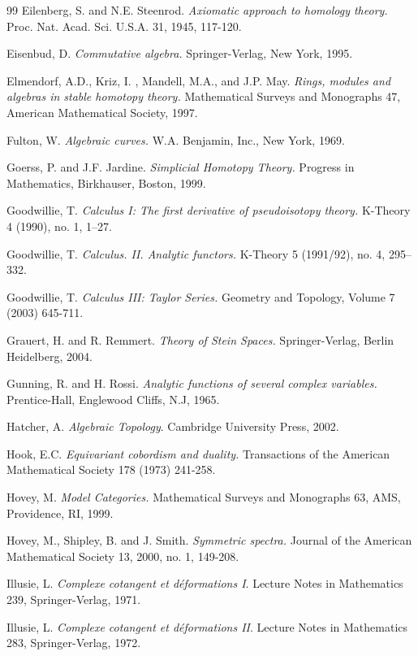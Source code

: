 \documentclass{article}
\theoremstyle{definition}
\begin{document}
\begin{thebibliography}{99}
 Eilenberg, S. and N.E. Steenrod. {\it Axiomatic approach to homology theory.} Proc. Nat. Acad. Sci. U.S.A. 31, 1945, 117-120.

 Eisenbud, D. {\it Commutative algebra.} Springer-Verlag, New York, 1995. 

 Elmendorf, A.D., Kriz, I. , Mandell, M.A., and J.P.
May. {\it Rings, modules and algebras in stable homotopy theory.}
Mathematical Surveys and Monographs 47, American Mathematical
Society, 1997.

 Fulton, W. {\it Algebraic curves.} W.A.
Benjamin, Inc., New York, 1969.

 Goerss, P. and J.F. Jardine. {\it Simplicial Homotopy Theory.} Progress in Mathematics, Birkhauser, Boston, 1999.

 Goodwillie, T. {\it Calculus I: The first derivative of pseudoisotopy theory.} K-Theory 4 (1990), no. 1, 1--27. 

 Goodwillie, T. {\it Calculus. II. Analytic functors.} K-Theory 5 (1991/92), no. 4, 295--332.

 Goodwillie, T. {\it Calculus III: Taylor Series.} Geometry and Topology, Volume 7 (2003) 645-711.

 Grauert, H. and R. Remmert. {\it Theory of Stein Spaces.} Springer-Verlag, Berlin Heidelberg, 2004.

 Gunning, R. and H. Rossi. {\it Analytic functions of several complex variables.} Prentice-Hall, Englewood Cliffs, N.J, 1965.

 Hatcher, A. {\it Algebraic Topology}. Cambridge University Press, 2002.

 Hook, E.C. {\it Equivariant cobordism and
duality.} Transactions of the American Mathematical Society 178
(1973) 241-258.

 Hovey, M. {\it Model Categories.}
Mathematical Surveys and Monographs 63, AMS, Providence, RI, 1999.

 Hovey, M., Shipley, B. and J. Smith. {\it Symmetric spectra.} Journal of the American Mathematical Society 13, 2000, no. 1, 149-208.

 Illusie, L. {\it Complexe cotangent et d\'{e}formations
I}. Lecture Notes in Mathematics 239, Springer-Verlag, 1971.

 Illusie, L. {\it Complexe cotangent et d\'{e}formations
II}. Lecture Notes in Mathematics 283, Springer-Verlag, 1972.


\end{thebibliography}
\end{document}
